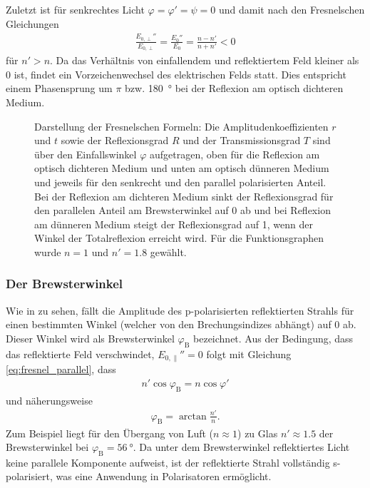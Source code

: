 Zuletzt ist für senkrechtes Licht $\varphi=\varphi'=\psi=0$ und damit nach den Fresnelschen Gleichungen
\begin{align*}
    \frac{E_{0,\perp}''}{E_{0,\perp}}=\frac{E_{0}''}{E_{0}} = \frac{n-n'}{n+n'} < 0
\end{align*}
für $n'>n$. Da das Verhältnis von einfallendem und reflektiertem Feld kleiner als $0$ ist, findet ein Vorzeichenwechsel des elektrischen Felds statt.
Dies entspricht einem Phasensprung um $\pi$ bzw. \SI{180}{\degree} bei der Reflexion am optisch dichteren Medium.

\begin{figure}[H]
    \centering
    \tfigFresnelEquations
    \caption{Darstellung der Fresnelschen Formeln: Die Amplitudenkoeffizienten $r$ und $t$ sowie der Reflexionsgrad $R$ und der Transmissionsgrad $T$ sind über den Einfallswinkel $\varphi$ aufgetragen, oben für die Reflexion am optisch dichteren Medium und unten am optisch dünneren Medium und jeweils für den senkrecht und den parallel polarisierten Anteil. Bei der Reflexion am dichteren Medium sinkt der Reflexionsgrad für den parallelen Anteil am Brewsterwinkel auf 0 ab und bei Reflexion am dünneren Medium steigt der Reflexionsgrad auf 1, wenn der Winkel der Totalreflexion erreicht wird. Für die Funktionsgraphen wurde $n=1$ und $n'=\num{1,8}$ gewählt. }
    \label{fig:fresnel_equations}
\end{figure}


\subsubsection{Der Brewsterwinkel}

Wie in  zu sehen, fällt die Amplitude des p-polarisierten reflektierten Strahls für einen bestimmten Winkel (welcher von den Brechungsindizes abhängt) auf $0$ ab.
Dieser Winkel wird als Brewsterwinkel $\varphi_\mathrm{B}$ bezeichnet. Aus der Bedingung, dass das reflektierte Feld verschwindet, $E_{0,\parallel}''=0$ folgt mit Gleichung \eqref{eq:fresnel_parallel}, dass
\begin{align*}
    n' \cos\varphi_\mathrm{B} = n \cos\varphi'
\end{align*}
und näherungsweise
\begin{align}
    \label{eq:brewsterwinkel}
    \varphi_\mathrm{B} = \arctan\frac{n'}{n}.
\end{align}
Zum Beispiel liegt für den Übergang von Luft ($n\approx 1$) zu Glas $n'\approx \num{1,5}$ der Brewsterwinkel bei $\varphi_\mathrm{B}=\SI{56}{\degree}$.
Da unter dem Brewsterwinkel reflektiertes Licht keine parallele Komponente aufweist, ist der reflektierte Strahl vollständig s-polarisiert, was eine Anwendung in Polarisatoren ermöglicht.

